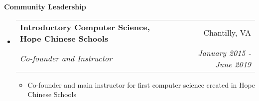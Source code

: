\documentclass[letterpaper,11pt]{article}
\makeatletter
\newcommand{\resitem}[1]{\item #1 \vspace{-2pt}}
\newcommand{\resheading}[1]{{\large \colorbox{mygrey}{\begin{minipage}{\textwidth}{\textbf{#1 \vphantom{p\^{E}}}}\end{minipage}}}}
\newcommand{\ressubheading}[4]{
\begin{tabular*}{7.0in}{l@{\extracolsep{\fill}}r}
		\textbf{#1} & #2 \\
		\textit{#3} & \textit{#4} \\
\end{tabular*}\vspace{-6pt}}
\makeatother
\begin{document}
\resheading{Community Leadership}
\begin{itemize}
\item
	\ressubheading{Introductory Computer Science, Hope Chinese Schools}{Chantilly, VA}{Co-founder and Instructor}{January 2015 - June 2019}
	\begin{itemize}
	    \resitem{Co-founder and main instructor for first computer science created in Hope Chinese Schools}
	\end{itemize}
	
\end{itemize}
\end{document}
